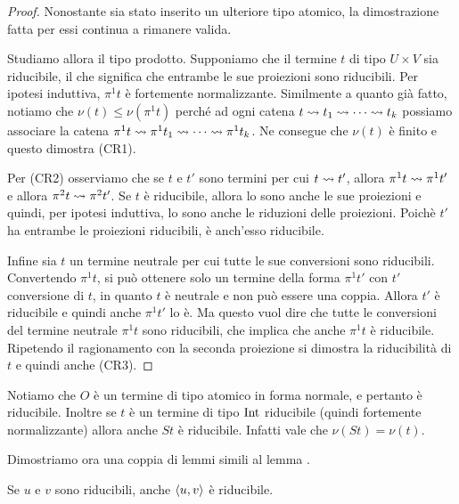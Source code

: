 \documentclass[]{marticle}
\begin{document}
\begin{proof}
    Nonostante sia stato inserito un ulteriore tipo atomico, la dimostrazione
    fatta per essi continua a rimanere valida.

    Studiamo allora il tipo prodotto. Supponiamo che il termine $t$ di tipo
    $U\times V$ sia riducibile, il che significa che entrambe le sue proiezioni
    sono riducibili. Per ipotesi induttiva, $\pi^1 t$ \`e fortemente
    normalizzante. Similmente a quanto gi\`a fatto, notiamo che $\nu(t)\leq
    \nu(\pi^1 t)$ perch\'e ad ogni catena $t \rightsquigarrow t_1 \rightsquigarrow \cdots \rightsquigarrow t_k$
    possiamo associare la catena $\pi^1 t \rightsquigarrow \pi^1 t_1\rightsquigarrow \cdots \rightsquigarrow
    \pi^1 t_k$. Ne consegue che $\nu(t)$ \`e finito e questo dimostra (CR1).

    Per (CR2) osserviamo che se $t$ e $t'$ sono termini per cui $t \rightsquigarrow t'$,
    allora $\pi^1 t \rightsquigarrow \pi^1 t'$ e allora $\pi^2 t \rightsquigarrow \pi^2 t'$. Se $t$
    \`e riducibile, allora lo sono anche le sue proiezioni e quindi, per ipotesi
    induttiva, lo sono anche le riduzioni delle proiezioni. Poich\`e $t'$ ha
    entrambe le proiezioni riducibili, \`e anch'esso riducibile.

    Infine sia $t$ un termine neutrale per cui tutte le sue conversioni sono
    riducibili.  Convertendo $\pi^1 t$, si pu\`o ottenere solo un termine della
    forma $\pi^1 t'$ con $t'$ conversione di $t$, in quanto $t$ \`e neutrale e
    non pu\`o essere una coppia. Allora $t'$ \`e riducibile e quindi anche
    $\pi^1 t'$ lo \`e. Ma questo vuol dire che tutte le conversioni del termine
    neutrale $\pi^1 t$ sono riducibili, che implica che anche $\pi^1 t$ \`e
    riducibile. Ripetendo il ragionamento con la seconda proiezione si dimostra
    la riducibilit\`a di $t$ e quindi anche (CR3).
\end{proof}

Notiamo che $O$ \`e un termine di tipo atomico in forma normale, e pertanto \`e
riducibile. Inoltre se $t$ \`e un termine di tipo $\text{Int}$ riducibile (quindi
fortemente normalizzante) allora anche $St$ \`e riducibile. Infatti vale che
$\nu(St)=\nu(t)$.

Dimostriamo ora una coppia di lemmi simili al lemma .

\begin{block}[Lemma]
    Se $u$ e $v$ sono riducibili, anche $\langle u,v \rangle$ \`e riducibile.
\end{block}
\end{document}
